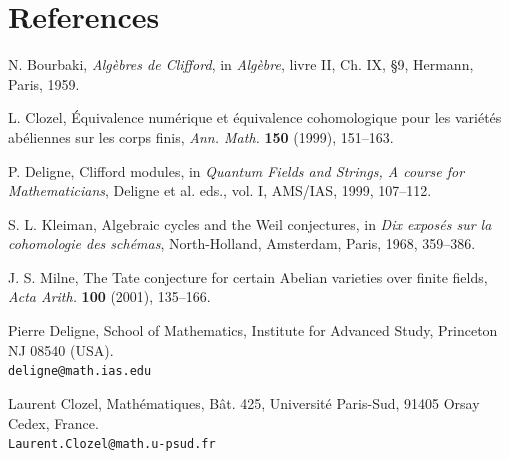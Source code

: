 \documentclass[11pt]{article}
\theoremstyle{deligne}
\begin{document}
\section*{References}
\begin{enumerate}[label={[\arabic*]}]
\item N. Bourbaki, \emph{Algèbres de Clifford}, in \emph{Algèbre}, livre II, Ch. IX, \S9, Hermann, Paris, 1959.
\item L. Clozel, Équivalence numérique et équivalence cohomologique pour les variétés abéliennes sur les corps finis, \emph{Ann. Math.} \textbf{150} (1999), 151--163.
\item P. Deligne, Clifford modules, in \emph{Quantum Fields and Strings, A course for Mathematicians}, Deligne et al. eds., vol. I, AMS/IAS, 1999, 107--112.
\item S. L. Kleiman, Algebraic cycles and the Weil conjectures, in \emph{Dix exposés sur la cohomologie des schémas}, North-Holland, Amsterdam, Paris, 1968, 359--386.
\item J. S. Milne, The Tate conjecture for certain Abelian varieties over finite fields, \emph{Acta Arith.} \textbf{100} (2001), 135--166.
\end{enumerate}

Pierre Deligne, School of Mathematics, Institute for Advanced Study, Princeton NJ 08540 (USA).\\
\texttt{deligne@math.ias.edu}

Laurent Clozel, Mathématiques, Bât. 425, Université Paris-Sud, 91405 Orsay Cedex, France.\\
\texttt{Laurent.Clozel@math.u-psud.fr}
\end{document}
